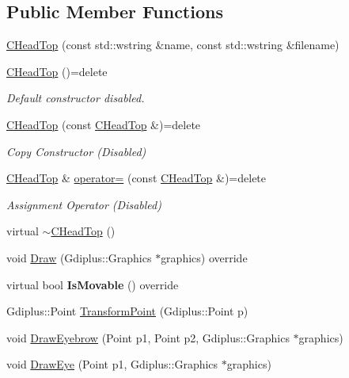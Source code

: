 \subsection*{Public Member Functions}
\begin{DoxyCompactItemize}
\item 
\hyperlink{class_c_head_top_a31333179dc1836d6ae5b9636b215b66b}{C\+Head\+Top} (const std\+::wstring \&name, const std\+::wstring \&filename)
\item 
\hypertarget{class_c_head_top_a54fab18f42f367ff9cfdf73537ada62f}{}\hyperlink{class_c_head_top_a54fab18f42f367ff9cfdf73537ada62f}{C\+Head\+Top} ()=delete\label{class_c_head_top_a54fab18f42f367ff9cfdf73537ada62f}

\begin{DoxyCompactList}\small\item\em Default constructor disabled. \end{DoxyCompactList}\item 
\hypertarget{class_c_head_top_a574b5950dff9f90de01219437f475cb9}{}\hyperlink{class_c_head_top_a574b5950dff9f90de01219437f475cb9}{C\+Head\+Top} (const \hyperlink{class_c_head_top}{C\+Head\+Top} \&)=delete\label{class_c_head_top_a574b5950dff9f90de01219437f475cb9}

\begin{DoxyCompactList}\small\item\em Copy Constructor (Disabled) \end{DoxyCompactList}\item 
\hypertarget{class_c_head_top_a9200b99a963f22b4ff4b369a09e47777}{}\hyperlink{class_c_head_top}{C\+Head\+Top} \& \hyperlink{class_c_head_top_a9200b99a963f22b4ff4b369a09e47777}{operator=} (const \hyperlink{class_c_head_top}{C\+Head\+Top} \&)=delete\label{class_c_head_top_a9200b99a963f22b4ff4b369a09e47777}

\begin{DoxyCompactList}\small\item\em Assignment Operator (Disabled) \end{DoxyCompactList}\item 
virtual \hyperlink{class_c_head_top_a64697c81bc0100f66aa661a8bc430fa9}{$\sim$\+C\+Head\+Top} ()
\item 
void \hyperlink{class_c_head_top_a70b7eec7548917c0e11aa5f38137daa9}{Draw} (Gdiplus\+::\+Graphics $\ast$graphics) override
\item 
\hypertarget{class_c_head_top_a62795abc9ca781cca83c43bbf7f44a9a}{}virtual bool {\bfseries Is\+Movable} () override\label{class_c_head_top_a62795abc9ca781cca83c43bbf7f44a9a}

\item 
Gdiplus\+::\+Point \hyperlink{class_c_head_top_a631542f2cc871fa17542b3253dc6ab73}{Transform\+Point} (Gdiplus\+::\+Point p)
\item 
void \hyperlink{class_c_head_top_aac91ed41a63e98abd4aa3c4c02cfaedb}{Draw\+Eyebrow} (Point p1, Point p2, Gdiplus\+::\+Graphics $\ast$graphics)
\item 
void \hyperlink{class_c_head_top_a864f2297a9dd3c47390bf554d5f3bb1d}{Draw\+Eye} (Point p1, Gdiplus\+::\+Graphics $\ast$graphics)
\end{DoxyCompactItemize}
